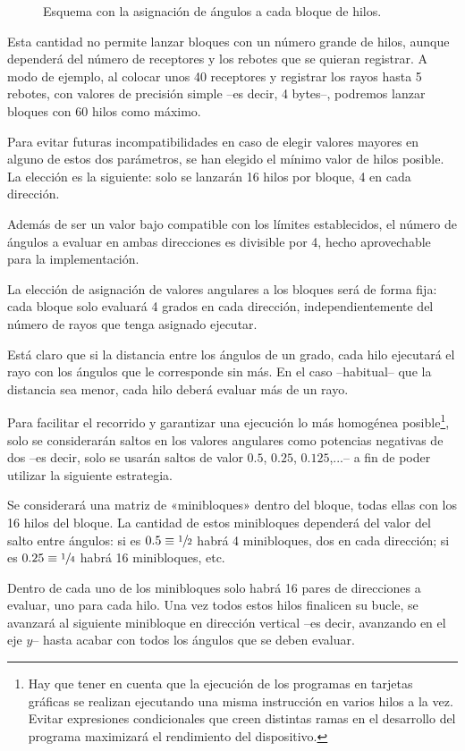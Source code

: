 \begin{figure}[H]
    \centering
    
    \caption{Esquema con la asignación de ángulos a cada bloque de hilos.}
    \label{fig:CUDA_angulos}
\end{figure}

Esta cantidad no permite lanzar bloques con un número grande de hilos, aunque dependerá del número de receptores y los rebotes que se quieran registrar.
A modo de ejemplo, al colocar unos 40 receptores y registrar los rayos hasta 5 rebotes, con valores de precisión simple --es decir, 4 bytes--, podremos lanzar bloques con 60 hilos como máximo.

Para evitar futuras incompatibilidades en caso de elegir valores mayores en alguno de estos dos parámetros, se han elegido el mínimo valor de hilos posible.
La elección es la siguiente: solo se lanzarán 16 hilos por bloque, 4 en cada dirección.

Además de ser un valor bajo compatible con los límites establecidos, el número de ángulos a evaluar en ambas direcciones es divisible por 4, hecho aprovechable para la implementación.

La elección de asignación de valores angulares a los bloques será de forma fija: cada bloque solo evaluará 4 grados en cada dirección, independientemente del número de rayos que tenga asignado ejecutar.

Está claro que si la distancia entre los ángulos de un grado, cada hilo ejecutará el rayo con los ángulos que le corresponde sin más.
En el caso --habitual-- que la distancia sea menor, cada hilo deberá evaluar más de un rayo.

Para facilitar el recorrido y garantizar una ejecución lo más homogénea posible\footnote{Hay que tener en cuenta que la ejecución de los programas en tarjetas gráficas se realizan ejecutando una misma instrucción en varios hilos a la vez. Evitar expresiones condicionales que creen distintas ramas en el desarrollo del programa maximizará el rendimiento del dispositivo.}, solo se considerarán saltos en los valores angulares como potencias negativas de dos --es decir, solo se usarán saltos de valor $0.5$, $0.25$, $0.125$,...-- a fin de poder utilizar la siguiente estrategia.

Se considerará una matriz de «minibloques» dentro del bloque, todas ellas con los 16 hilos del bloque.
La cantidad de estos minibloques dependerá del valor del salto entre ángulos: si es $0.5 \equiv \sfrac{1}{2}$ habrá 4 minibloques, dos en cada dirección; si es $0.25 \equiv \sfrac{1}{4}$ habrá 16 minibloques, etc.

Dentro de cada uno de los minibloques solo habrá 16 pares de direcciones a evaluar, uno para cada hilo.
Una vez todos estos hilos finalicen su bucle, se avanzará al siguiente minibloque en dirección vertical --es decir, avanzando en el eje $y$-- hasta acabar con todos los ángulos que se deben evaluar.